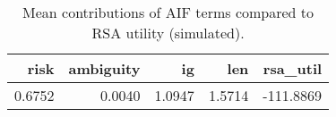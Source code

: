 \begin{table}[!ht]
\centering
\begin{table}
\caption{Mean contributions of AIF terms compared to RSA utility (simulated).}
\label{tab:fig01}
\begin{tabular}{rrrrr}
\toprule
risk & ambiguity & ig & len & rsa\_util \\
\midrule
0.6752 & 0.0040 & 1.0947 & 1.5714 & -111.8869 \\
\bottomrule
\end{tabular}
\end{table}
\end{table}
